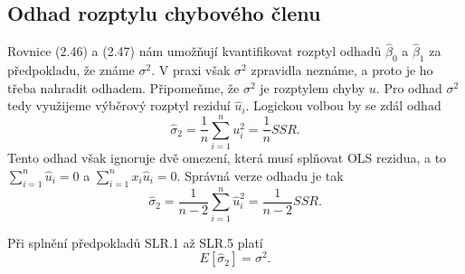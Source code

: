 \subsection{Odhad rozptylu chybového členu}

Rovnice (2.46) a (2.47) nám umožňují kvantifikovat rozptyl odhadů $\hat{\beta}_0$ a $\hat{\beta}_1$ za 
předpokladu, že známe $\sigma^2$. V praxi však $\sigma^2$ zpravidla neznáme, a proto je ho třeba nahradit 
odhadem. Připomeňme, že $\sigma^2$ je rozptylem chyby $u$. Pro odhad $\sigma^2$ tedy využijeme výběrový rozptyl 
reziduí $\hat{u}_i$. Logickou volbou by se zdál odhad
\begin{equation}
\hat{\sigma}_2 = \frac{1}{n} \sum_{i = 1}^n u_i^2 = \frac{1}{n} SSR.
\end{equation}
Tento odhad však ignoruje dvě omezení, která musí splňovat OLS rezidua, a to $\sum_{i = 1}^n \hat{u}_i = 0$ a 
$\sum_{i = 1}^n x_i \hat{u}_i = 0$. Správná verze odhadu je tak
\begin{equation}
\hat{\sigma}_2 = \frac{1}{n-2}\sum_{i = 1}^n \hat{u}_i^2 = \frac{1}{n - 2}SSR.
\end{equation}

\begin{theorem}
Při splnění předpokladů SLR.1 až SLR.5 platí
\begin{equation}
E[\hat{\sigma}_2] = \sigma^2.
\end{equation}

\raggedleft{$\clubsuit$}
\end{theorem}

